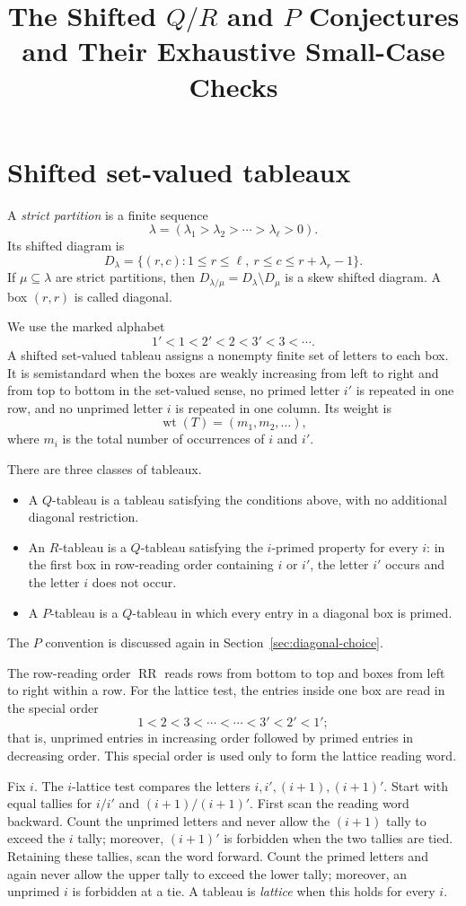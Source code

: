 \documentclass[11pt]{article}
\title{The Shifted $Q/R$ and $P$ Conjectures and Their Exhaustive Small-Case Checks}
\author{}
\date{}
\theoremstyle{definition}
\theoremstyle{remark}
\newcommand{\wt}{\operatorname{wt}}
\newcommand{\RR}{\operatorname{RR}}
\begin{document}
\maketitle

\section{Shifted set-valued tableaux}

A \emph{strict partition} is a finite sequence
\[
  \lambda=(\lambda_1>\lambda_2>\cdots>\lambda_{\ell}>0).
\]
Its shifted diagram is
\[
  D_\lambda=\{(r,c):1\le r\le \ell,\ r\le c\le r+\lambda_r-1\}.
\]
If $\mu\subseteq\lambda$ are strict partitions, then
$D_{\lambda/\mu}=D_\lambda\setminus D_\mu$ is a skew shifted diagram.  A box
$(r,r)$ is called diagonal.

We use the marked alphabet
\[
  1'<1<2'<2<3'<3<\cdots.
\]
A shifted set-valued tableau assigns a nonempty finite set of letters to each
box.  It is semistandard when the boxes are weakly increasing from left to
right and from top to bottom in the set-valued sense, no primed letter $i'$ is
repeated in one row, and no unprimed letter $i$ is repeated in one column.  Its
weight is
\[
  \wt(T)=(m_1,m_2,\ldots),
\]
where $m_i$ is the total number of occurrences of $i$ and $i'$.

There are three classes of tableaux.
\begin{itemize}[leftmargin=2em]
\item A $Q$-tableau is a tableau satisfying the conditions above, with no
additional diagonal restriction.
\item An $R$-tableau is a $Q$-tableau satisfying the $i$-primed property for
every $i$: in the first box in row-reading order containing $i$ or $i'$, the
letter $i'$ occurs and the letter $i$ does not occur.
\item A $P$-tableau is a $Q$-tableau in which every entry in a diagonal box is
primed.
\end{itemize}
The $P$ convention is discussed again in Section~\ref{sec:diagonal-choice}.

The row-reading order $\RR$ reads rows from bottom to top and boxes from left
to right within a row.  For the lattice test, the entries inside one box are
read in the special order
\[
  1<2<3<\cdots<\cdots<3'<2'<1';
\]
that is, unprimed entries in increasing order followed by primed entries in
decreasing order.  This special order is used only to form the lattice reading
word.

Fix $i$.  The $i$-lattice test compares the letters $i,i',(i+1),(i+1)'$.
Start with equal tallies for $i/i'$ and $(i+1)/(i+1)'$.  First scan the reading
word backward.  Count the unprimed letters and never allow the $(i+1)$ tally
to exceed the $i$ tally; moreover, $(i+1)'$ is forbidden when the two tallies
are tied.  Retaining these tallies, scan the word forward.  Count the primed
letters and again never allow the upper tally to exceed the lower tally;
moreover, an unprimed $i$ is forbidden at a tie.  A tableau is \emph{lattice}
when this holds for every $i$.
\end{document}
